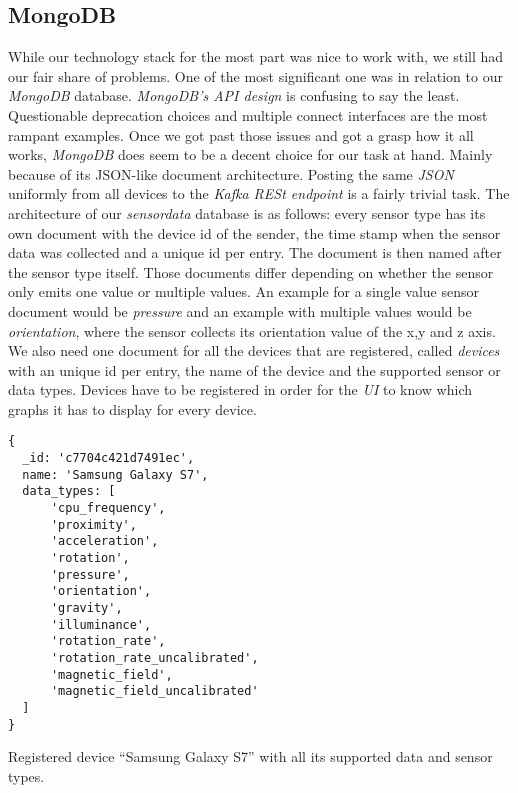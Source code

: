 \subsection{MongoDB}

While our technology stack for the most part was nice to work with, we still had our fair share of
problems. One of the most significant one was in relation to our \textit{MongoDB} database.
\textit{MongoDB’s API design} is confusing to say the least. Questionable deprecation choices and
multiple connect interfaces are the most rampant examples. Once we got past those issues and got a
grasp how it all works, \textit{MongoDB} does seem to be a decent choice for our task at hand.
Mainly because of its JSON-like document architecture. Posting the same \textit{JSON} uniformly from
all devices to the \textit{Kafka RESt endpoint} is a fairly trivial task. The architecture of our
\textit{sensordata} database is as follows: every sensor type has its own document with the device
id of the sender, the time stamp when the sensor data was collected and a unique id per entry. The
document is then named after the sensor type itself. Those documents differ depending on whether the
sensor only emits one value or multiple values. An example for a single value sensor document would
be \textit{pressure} and an example with multiple values would be \textit{orientation}, where the
sensor collects its orientation value of the x,y and z axis. We also need one document for all the
devices that are registered, called \textit{devices} with an unique id per entry, the name of the
device and the supported sensor or data types. Devices have to be registered in order for the
\textit{UI} to know which graphs it has to display for every device.

\begin{code}[H]
  \centering
  \begin{lstlisting}[basicstyle=\small\ttfamily]
{
  _id: 'c7704c421d7491ec',
  name: 'Samsung Galaxy S7',
  data_types: [
      'cpu_frequency',
      'proximity',
      'acceleration',
      'rotation',
      'pressure',
      'orientation',
      'gravity',
      'illuminance',
      'rotation_rate',
      'rotation_rate_uncalibrated',
      'magnetic_field',
      'magnetic_field_uncalibrated'
  ]
}
  \end{lstlisting}
  \caption{Registered device “Samsung Galaxy S7” with all its supported data and sensor types.}
\end{code}
